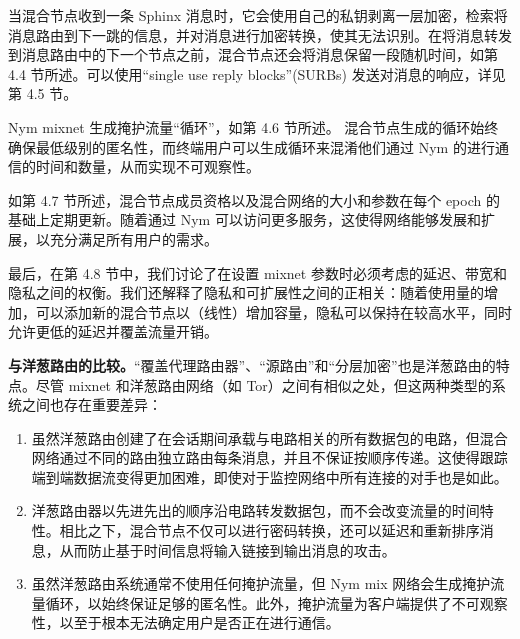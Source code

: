 \documentclass{article}
\begin{document}
	当混合节点收到一条 Sphinx 消息时，它会使用自己的私钥剥离一层加密，检索将消息路由到下一跳的信息，并对消息进行加密转换，使其无法识别。在将消息转发到消息路由中的下一个节点之前，混合节点还会将消息保留一段随机时间，如第 4.4 节所述。可以使用“single use reply blocks”(SURBs) 发送对消息的响应，详见第 4.5 节。\newline

	Nym mixnet 生成掩护流量“循环”，如第 4.6 节所述。 混合节点生成的循环始终确保最低级别的匿名性，而终端用户可以生成循环来混淆他们通过 Nym 的进行通信的时间和数量，从而实现不可观察性。\newline

	如第 4.7 节所述，混合节点成员资格以及混合网络的大小和参数在每个 epoch 的基础上定期更新。随着通过 Nym 可以访问更多服务，这使得网络能够发展和扩展，以充分满足所有用户的需求。\newline

	最后，在第 4.8 节中，我们讨论了在设置 mixnet 参数时必须考虑的延迟、带宽和隐私之间的权衡。我们还解释了隐私和可扩展性之间的正相关：随着使用量的增加，可以添加新的混合节点以（线性）增加容量，隐私可以保持在较高水平，同时允许更低的延迟并覆盖流量开销。\newline

	\textbf{与洋葱路由的比较。}“覆盖代理路由器”、“源路由”和“分层加密”也是洋葱路由的特点。尽管 mixnet 和洋葱路由网络（如 Tor）之间有相似之处，但这两种类型的系统之间也存在重要差异：
	
\begin{enumerate}[1. ]
\item 虽然洋葱路由创建了在会话期间承载与电路相关的所有数据包的电路，但混合网络通过不同的路由独立路由每条消息，并且不保证按顺序传递。这使得跟踪端到端数据流变得更加困难，即使对于监控网络中所有连接的对手也是如此。
\item 洋葱路由器以先进先出的顺序沿电路转发数据包，而不会改变流量的时间特性。相比之下，混合节点不仅可以进行密码转换，还可以延迟和重新排序消息，从而防止基于时间信息将输入链接到输出消息的攻击。
\item 虽然洋葱路由系统通常不使用任何掩护流量，但 Nym mix 网络会生成掩护流量循环，以始终保证足够的匿名性。此外，掩护流量为客户端提供了不可观察性，以至于根本无法确定用户是否正在进行通信。
\end{enumerate}
\end{document}
